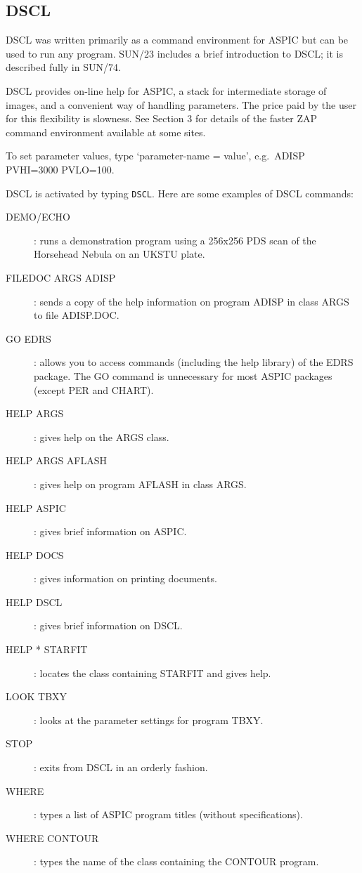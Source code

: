 \subsection {DSCL}
DSCL was written primarily as a command environment for ASPIC but can be used
to run any program.
SUN/23 includes a brief introduction to DSCL; it is  described fully in SUN/74.

DSCL provides on-line help for ASPIC, a stack for intermediate storage of
images, and a convenient way of handling parameters.
The price paid by the user for this flexibility is slowness.
See Section 3 for details of the faster ZAP command environment
available at some sites.

To set parameter values, type `parameter-name = value', e.g.\ ADISP PVHI=3000
PVLO=100.

DSCL is activated by typing {\tt DSCL}.
Here are some examples of DSCL commands:
\begin{description}
\begin{description}
\item[DEMO/ECHO]:
runs a demonstration program using a 256x256 PDS scan of the Horsehead Nebula
on an UKSTU plate.
\item[FILEDOC ARGS ADISP]:
sends a copy of the help information on program ADISP in class ARGS to file
ADISP.DOC.
\item[GO EDRS]:
allows you to access commands (including the help library) of the EDRS package.
The GO command is unnecessary for most ASPIC packages (except PER and CHART).
\item[HELP ARGS]:
gives help on the ARGS class.
\item[HELP ARGS AFLASH]:
gives help on program AFLASH in class ARGS.
\item[HELP ASPIC]:
gives brief information on ASPIC.
\item[HELP DOCS]:
gives information on printing documents.
\item[HELP DSCL]:
gives brief information on DSCL.
\item[HELP * STARFIT]:
locates the class containing STARFIT and gives help.
\item[LOOK TBXY]:
looks at the parameter settings for program TBXY.
\item[STOP]:
exits from DSCL in an orderly fashion.
\item[WHERE]:
types a list of ASPIC program titles (without specifications).
\item[WHERE CONTOUR]:
types the name of the class containing the CONTOUR program.
\end{description}
\end{description}

